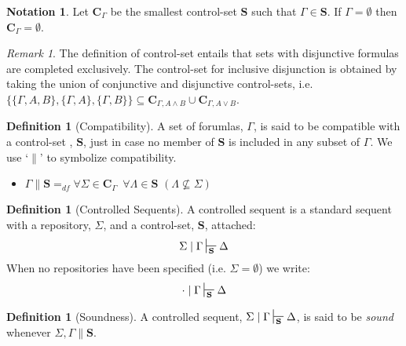 \documentclass{article}                     %
\theoremstyle{theorem}
\theoremstyle{corollary}
\theoremstyle{lemma}
\theoremstyle{definition}
\newtheorem{definition}[section]{Definition}
\theoremstyle{remark}
\newtheorem{remark}{Remark}
\theoremstyle{definition}
\theoremstyle{notation}
\newtheorem{notation}{Notation}
\theoremstyle{definition}
\theoremstyle{proposition}
\theoremstyle{definition}
\begin{document}
\begin{notation}
	Let $ \mathbf{C}_{\Gamma} $ be the smallest control-set $ \mathbf{S} $ such that $ \Gamma \in \mathbf{S} $. If $ \Gamma = \emptyset $ then $ \mathbf{C}_{\Gamma} = \emptyset $.
\end{notation}


\begin{remark}
The definition of control-set entails that sets with disjunctive formulas are completed exclusively. The control-set for inclusive disjunction is obtained by taking the union of conjunctive and disjunctive control-sets, i.e. $ \{\{\Gamma, A, B\}, \{\Gamma, A\}, \{\Gamma, B\} \} \subseteq \mathbf{C}_{\Gamma, A \wedge B} \cup \mathbf{C}_{\Gamma, A \vee B} $.
\end{remark}

\begin{definition}[Compatibility]
A set of forumlas, $\Gamma$, is said to be compatible with a control-set , $\mathbf{S}$, just in case no member of $\mathbf{S}$ is included in any subset of $\Gamma$. We use `$\parallel$' to symbolize compatibility.
\begin{itemize}
\item $\Gamma\parallel\mathbf{S} =_{df} \forall \Sigma \in \mathbf{C}_{\Gamma}\,\,\, \forall \Lambda \in \mathbf{S}\,\,(\Lambda \not\subseteq \Sigma) $
\end{itemize}
\end{definition}

\begin{definition}[Controlled Sequents]
	A controlled sequent is a standard sequent with  a repository, $ \Sigma $, and a control-set, $ \mathbf{S} $, attached:
	$$ \Sigma\mid\Gamma\sststile{\mathbf{S}}{}\Delta $$
	When no repositories have been specified (i.e. $\Sigma = \emptyset$) we write:
	$$ \cdot\mid\Gamma\sststile{\mathbf{S}}{}\Delta$$
\end{definition}

\begin{definition}[Soundness]
	A controlled sequent, $ \Sigma\mid\Gamma \sststile{\mathbf{S}}{} \Delta $, is said to be \textit{sound} whenever $ \Sigma,\Gamma\parallel\mathbf{S} $.
	
\end{definition}
\end{document}
